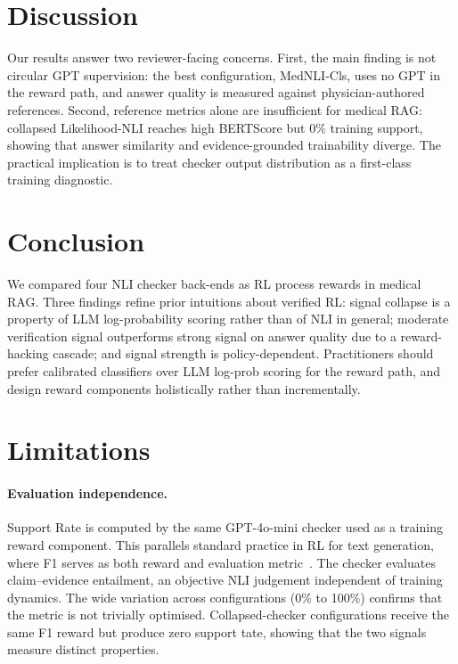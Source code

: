 \documentclass[11pt]{article}
\begin{document}
\section{Discussion}
Our results answer two reviewer-facing concerns. First, the main finding is not circular GPT supervision: the best configuration, MedNLI-Cls, uses no GPT in the reward path, and answer quality is measured against physician-authored references. Second, reference metrics alone are insufficient for medical RAG: collapsed Likelihood-NLI reaches high BERTScore but 0\% training support, showing that answer similarity and evidence-grounded trainability diverge. The practical implication is to treat checker output distribution as a first-class training diagnostic.

\section{Conclusion}
\label{sec:conclusion}

We compared four NLI checker back-ends as RL
process rewards in medical RAG. Three findings refine
prior intuitions about verified RL: signal collapse is
a property of LLM log-probability scoring rather than
of NLI in general; moderate verification signal
outperforms strong signal on answer quality due to a
reward-hacking cascade; and signal strength is
policy-dependent. Practitioners should prefer
calibrated classifiers over LLM log-prob scoring for
the reward path, and design reward components
holistically rather than incrementally. 

\section*{Limitations}
\paragraph{Evaluation independence.}
Support Rate is computed by the same GPT-4o-mini checker used as a training reward component.
This parallels standard practice in RL for text generation, where F1 serves as both reward and evaluation metric~\citep{jin2025search}.
The checker evaluates claim--evidence entailment, an objective NLI judgement independent of training dynamics.
The wide variation across configurations (0\% to 100\%) confirms that the metric is not trivially optimised. Collapsed-checker configurations receive the same F1 reward but produce zero support tate, showing that the two signals measure distinct properties.
\end{document}

